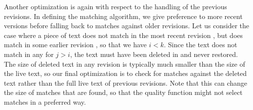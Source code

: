 Another optimization is again with respect to the handling of the
previous revisions.
In defining the matching algorithm, we give preference to more recent
versions before falling back to matches against older revisions.
Let us consider the case where a piece of text does not match in the
most recent revision ,
but does match in some earlier revision , so that we have $i < k$.
Since the text does not match in any  for $j > i$,
the text must have been deleted in  and
never restored.
The size of deleted text in any revision is typically much smaller
than the size of the live text, so our final optimization is
to check for matches against the deleted text rather than the full
live text of previous revisions.
Note that this can change the size of matches that are found,
so that the quality function might not select matches in a preferred way.

